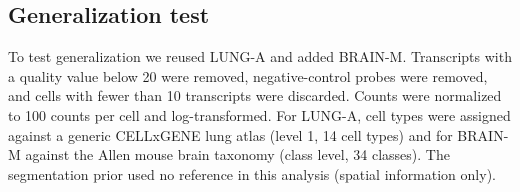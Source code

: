 \documentclass[11pt]{article}
\begin{document}
\subsection{Generalization test}

To test generalization we reused LUNG-A and added BRAIN-M. Transcripts with a quality value below 20 were removed, negative-control probes were removed, and cells with fewer than 10 transcripts were discarded. Counts were normalized to 100 counts per cell and log-transformed. For LUNG-A, cell types were assigned against a generic CELLxGENE lung atlas (level 1, 14 cell types) and for BRAIN-M against the Allen mouse brain taxonomy (class level, 34 classes). The segmentation prior used no reference in this analysis (spatial information only).
\end{document}
